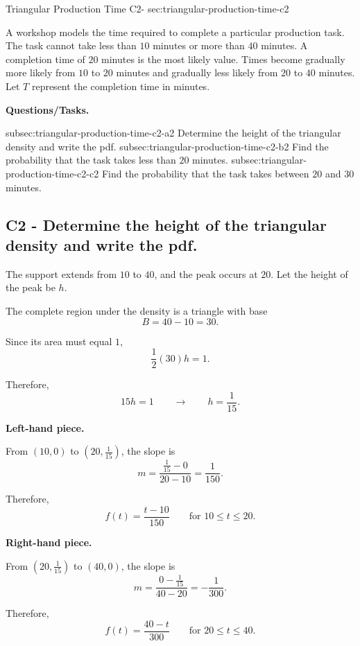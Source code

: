 	\sectionScored
	{Triangular Production Time}
	{C2-}
	{sec:triangular-production-time-c2}
	{
	A workshop models the time required to complete a particular production task. The task cannot take less than $10$ minutes or more than $40$ minutes. A completion time of $20$ minutes is the most likely value. Times become gradually more likely from $10$ to $20$ minutes and gradually less likely from $20$ to $40$ minutes. Let $T$ represent the completion time in minutes.
	
	\textbf{Questions/Tasks.}
	\begin{enumerate}
		\CriterionTask
		{subsec:triangular-production-time-c2-a}{2}
		{Determine the height of the triangular density and write the pdf. }
		\CriterionTask
		{subsec:triangular-production-time-c2-b}{2}
		{Find the probability that the task takes less than $20$ minutes. }
		\CriterionTask
		{subsec:triangular-production-time-c2-c}{2}
		{Find the probability that the task takes between $20$ and $30$ minutes. }
	\end{enumerate}
	
	\label{subsec:triangular-production-time-c2-a}
	\subsection*{C2 - Determine the height of the triangular density and write the pdf. }
	
	The support extends from $10$ to $40$, and the peak occurs at $20$. Let the height of the peak be $h$.
	
	The complete region under the density is a triangle with base
	\[
	B=40-10=30.
	\]
	
	Since its area must equal $1$,
	\[
	\frac{1}{2}(30)h=1.
	\]
	
	Therefore,
	\[
	15h=1
	\qquad \longrightarrow \qquad
	h=\frac{1}{15}.
	\]
	
	\textbf{Left-hand piece.}
	
	From $(10,0)$ to $\left(20,\frac{1}{15}\right)$, the slope is
	\[
	m=\frac{\frac{1}{15}-0}{20-10}
	=\frac{1}{150}.
	\]
	
	Therefore,
	\[
	f(t)=\frac{t-10}{150}
	\qquad
	\text{for }10\le t\le20.
	\]
	
	\textbf{Right-hand piece.}
	
	From $\left(20,\frac{1}{15}\right)$ to $(40,0)$, the slope is
	\[
	m=
	\frac{0-\frac{1}{15}}{40-20}
	=-\frac{1}{300}.
	\]
	
	Therefore,
	\[
	f(t)=\frac{40-t}{300}
	\qquad
	\text{for }20\le t\le40.
	\]
	
}
